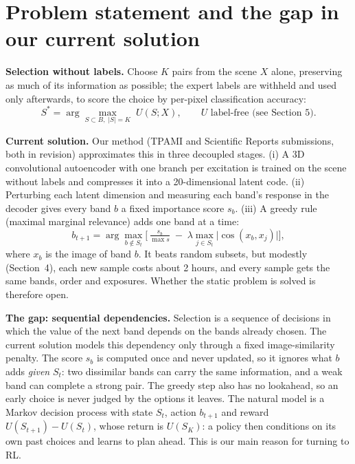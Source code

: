 \documentclass[11pt,a4paper]{article}
\begin{document}
\section{Problem statement and the gap in our current solution}
\textbf{Selection without labels.} Choose $K$ pairs from the scene $X$ alone, preserving as much of its information as possible; the expert labels are withheld and used only afterwards, to score the choice by per-pixel classification accuracy:
\begin{equation*}
S^{*} = \arg\max_{S \subset B,\; |S| = K} \; U(S; X), \qquad U \text{ label-free (see Section 5)}.
\end{equation*}

\textbf{Current solution.} Our method (TPAMI and Scientific Reports submissions, both in revision) approximates this in three decoupled stages. (i) A 3D convolutional autoencoder with one branch per excitation is trained on the scene without labels and compresses it into a 20-dimensional latent code. (ii) Perturbing each latent dimension and measuring each band's response in the decoder gives every band $b$ a fixed importance score $s_b$. (iii) A greedy rule (maximal marginal relevance) adds one band at a time:
\begin{equation*}
b_{t+1} = \arg\max_{b \notin S_t} \Big[\, \tfrac{s_b}{\max s} \;-\; \lambda \max_{j \in S_t} \lvert \cos(x_b, x_j) \rvert \Big],
\end{equation*}
where $x_b$ is the image of band $b$. It beats random subsets, but modestly (Section~4), each new sample costs about 2 hours, and every sample gets the same bands, order and exposures. Whether the static problem is solved is therefore open.

\textbf{The gap: sequential dependencies.} Selection is a sequence of decisions in which the value of the next band depends on the bands already chosen. The current solution models this dependency only through a fixed image-similarity penalty. The score $s_b$ is computed once and never updated, so it ignores what $b$ adds \emph{given} $S_t$: two dissimilar bands can carry the same information, and a weak band can complete a strong pair. The greedy step also has no lookahead, so an early choice is never judged by the options it leaves. The natural model is a Markov decision process with state $S_t$, action $b_{t+1}$ and reward $U(S_{t+1}) - U(S_t)$, whose return is $U(S_K)$: a policy then conditions on its own past choices and learns to plan ahead. This is our main reason for turning to RL.
\end{document}
